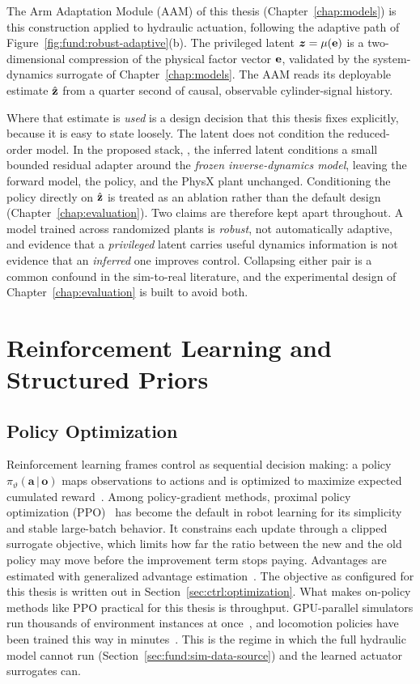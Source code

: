 The Arm Adaptation Module (AAM) of this thesis
(Chapter~\ref{chap:models}) is this construction applied to hydraulic
actuation, following the adaptive path of
Figure~\ref{fig:fund:robust-adaptive}(b). The privileged latent
$\bm{z} = \mu(\mathbf{e})$ is a two-dimensional compression of the
physical factor vector $\mathbf{e}$, validated by the system-dynamics
surrogate of Chapter~\ref{chap:models}. The AAM reads its deployable
estimate $\hat{\mathbf{z}}$ from a quarter second of causal, observable
cylinder-signal history.

Where that estimate is \emph{used} is a design decision that this thesis
fixes explicitly, because it is easy to state loosely. The latent does
not condition the reduced-order model. In the proposed stack,
\ppoIDAAMFD, the inferred latent conditions a small bounded residual
adapter around the \emph{frozen inverse-dynamics model}, leaving the
forward model, the policy, and the PhysX plant unchanged. Conditioning
the policy directly on $\hat{\mathbf{z}}$ is treated as an ablation rather
than the default design (Chapter~\ref{chap:evaluation}). Two claims are
therefore kept apart throughout. A model trained across randomized
plants is \emph{robust}, not automatically adaptive, and evidence that a
\emph{privileged} latent carries useful dynamics information is not
evidence that an \emph{inferred} one improves control. Collapsing either
pair is a common confound in the sim-to-real literature, and the
experimental design of Chapter~\ref{chap:evaluation} is built to avoid
both.

\section{Reinforcement Learning and Structured Priors}
\label{sec:fund:rl-residual}

\subsection{Policy Optimization}

Reinforcement learning frames control as sequential decision making: a
policy $\pi_\vartheta(\bm{a}\,|\,\bm{o})$ maps observations to actions
and is optimized to maximize expected cumulated
reward~\cite{sutton2018reinforcement}. Among policy-gradient methods,
proximal policy optimization (PPO)~\cite{schulman2017proximal} has
become the default in robot learning for its simplicity and stable
large-batch behavior. It constrains each update through a clipped surrogate objective, which
limits how far the ratio between the new and the old policy may move before
the improvement term stops paying. Advantages are estimated with generalized
advantage estimation~\cite{schulman2016gae}. The objective as configured for
this thesis is written out in Section~\ref{sec:ctrl:optimization}. What makes
on-policy methods like PPO practical for this thesis is throughput.
GPU-parallel simulators run thousands of environment instances at
once~\cite{makoviychuk2021isaac}, and locomotion policies have been
trained this way in minutes~\cite{rudin2022learning}. This is the regime
in which the full hydraulic model cannot run
(Section~\ref{sec:fund:sim-data-source}) and the learned actuator
surrogates can.

